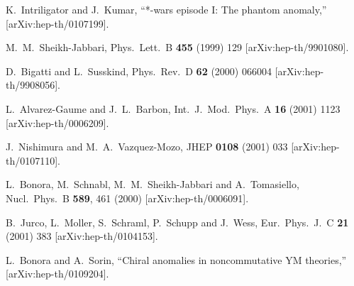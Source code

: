 \documentclass[a4paper,12pt]{article}
\begin{document}
\begin{thebibliography}{99}
K.~Intriligator and J.~Kumar,
``*-wars episode I: The phantom anomaly,''
[arXiv:hep-th/0107199].

M.~M.~Sheikh-Jabbari,
Phys.\ Lett.\ B {\bf 455} (1999) 129
[arXiv:hep-th/9901080].

D.~Bigatti and L.~Susskind,
Phys.\ Rev.\ D {\bf 62} (2000) 066004
[arXiv:hep-th/9908056].


L.~Alvarez-Gaume and J.~L.~Barbon,
Int.\ J.\ Mod.\ Phys.\ A {\bf 16} (2001) 1123
[arXiv:hep-th/0006209].







J.~Nishimura and M.~A.~Vazquez-Mozo,
JHEP {\bf 0108} (2001) 033
[arXiv:hep-th/0107110].





L.~Bonora, M.~Schnabl, M.~M.~Sheikh-Jabbari and A.~Tomasiello,
Nucl.\ Phys.\ B {\bf 589}, 461 (2000)
[arXiv:hep-th/0006091].


B.~Jurco, L.~Moller, S.~Schraml, P.~Schupp and J.~Wess,
Eur.\ Phys.\ J.\ C {\bf 21} (2001) 383
[arXiv:hep-th/0104153].

L.~Bonora and A.~Sorin,
``Chiral anomalies in noncommutative YM theories,''
[arXiv:hep-th/0109204].





\end{thebibliography}
\end{document}
